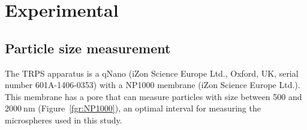 \documentclass[journal=langd5,manuscript=article]{achemso}
\begin{document}


\section{Experimental} %
\subsection{Particle size measurement}

The TRPS apparatus is a qNano (iZon Science Europe Ltd., Oxford, UK, serial number 601A-1406-0353) with a NP1000 membrane (iZon Science Europe Ltd.). This membrane has a pore that can measure particles with size between 500 and $2000~\mathrm{nm}$ (Figure~\ref{fgr:NP1000}), an optimal interval for measuring the microspheres used in this study.
\end{document}
